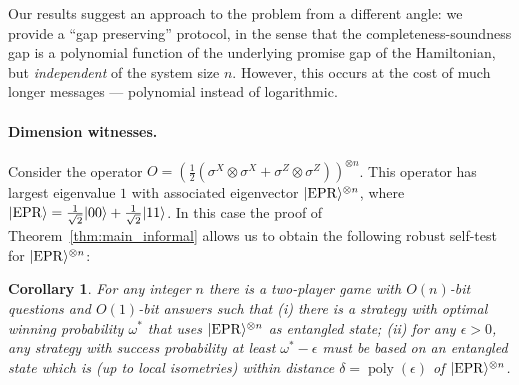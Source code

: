 \documentclass[11pt,letterpaper]{article}
\newcommand{\<}{\langle}
\renewcommand{\>}{\rangle}
\newtheorem{corollary}[theorem]{Corollary}
\newcommand{\QMA}{\textsc{QMA}}
\newcommand{\epr}{{\rm EPR}}
\newcommand{\ket}[1]{| #1 \>}
\newcommand{\eps}{\epsilon}
\DeclareMathOperator{\poly}{poly}
\newcommand{\anote}[1]{\textcolor{red}{\small {\textbf{(Anand:} #1\textbf{) }}}}
\newcommand{\anote}[1]{{}}
\begin{document}
Our results suggest an approach to the problem from a different angle: we provide a ``gap preserving'' protocol, in the sense that the completeness-soundness gap is a polynomial function of the underlying promise gap of
the Hamiltonian, but \emph{independent} of the system size
$n$. However, this occurs at the cost of much longer messages --- polynomial instead of logarithmic. 

\paragraph{Dimension witnesses.}
Consider the operator
$O = (\frac{1}{2}(\sigma^X\otimes \sigma^X+ \sigma^Z\otimes
\sigma^Z))^{\otimes n}$.
This operator has largest eigenvalue $1$ with associated eigenvector
$\ket{\epr}^{\otimes n}$, where $\ket{\epr} = \frac{1}{\sqrt{2}}\ket{00}+\frac{1}{\sqrt{2}}\ket{11}$. In this case the proof of
Theorem~\ref{thm:main_informal} allows us to obtain the following robust
self-test for $\ket{\epr}^{\otimes n}$:

\begin{corollary}\label{cor:epr}
For any integer $n$ there is a two-player game with
  $O(n)$-bit questions and $O(1)$-bit answers such that (i) there is a
  strategy with optimal winning probability $\omega^*$ that uses
  $\ket{\epr}^{\otimes n}$ as entangled state; (ii) for any $\eps>0$, any strategy with
  success probability at least $\omega^*-\eps$ must be based on
  an entangled state which is (up to local isometries) within distance $\delta=\poly(\eps)$  of  $\ket{\epr}^{\otimes n}$.
\end{corollary}
\end{document}
